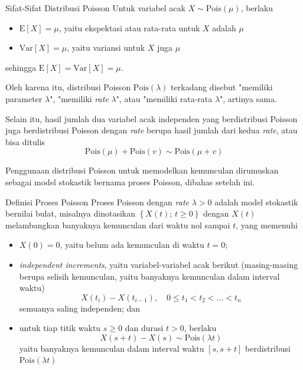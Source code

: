 \documentclass{beamer}
\newcommand{\pars}[1]{\left(#1\right)}
\newcommand{\brackets}[1]{\left[#1\right]}
\newcommand{\braces}[1]{\left\{#1\right\}}
\begin{document}
\begin{frame}{Sifat-Sifat Distribusi Poisson}
    Untuk variabel acak \(X \sim \text{Pois}(\mu)\), berlaku
    \begin{itemize}
        \item \(\text{E}\brackets{X} = \mu\), yaitu ekspektasi atau rata-rata untuk \(X\) adalah \(\mu\)
        \item \(\text{Var}\brackets{X} = \mu\), yaitu variansi untuk \(X\) juga \(\mu\)
    \end{itemize}
    sehingga \(\text{E}\brackets{X} = \text{Var}\brackets{X} = \mu\).

    Oleh karena itu, distribusi Poisson \(\text{Pois}(\lambda)\) terkadang disebut "memiliki parameter \(\lambda\)", "memiliki \textit{rate} \(\lambda\)", atau "memiliki rata-rata \(\lambda\)", artinya sama.

    Selain itu, hasil jumlah dua variabel acak independen yang berdistribusi Poisson juga berdistribusi Poisson dengan \textit{rate} berupa hasil jumlah dari kedua \textit{rate}, atau bisa ditulis
    \[\text{Pois}(\mu) + \text{Pois}(v) \sim \text{Pois}(\mu + v)\]

    Penggunaan distribusi Poisson untuk memodelkan kemunculan dirumuskan sebagai model stokastik bernama proses Poisson, dibahas setelah ini.
\end{frame}

\begin{frame}{Definisi Proses Poisson}
    Proses Poisson dengan \textit{rate} \(\lambda > 0\) adalah model stokastik bernilai bulat, misalnya dinotasikan \( \braces{X(t); \, t \ge 0} \) dengan \(X(t)\) melambangkan banyaknya kemunculan dari waktu nol sampai \(t\), yang memenuhi
    \begin{itemize}
        \item \(X(0) = 0\), yaitu belum ada kemunculan di waktu \(t=0\);
        \item \textit{independent increments}, yaitu variabel-variabel acak berikut (masing-masing berupa selisih kemunculan, yaitu banyaknya kemunculan dalam interval waktu)
        \[ X\pars{t_i} - X\pars{t_{i-1}}, \quad 0 \le t_1 < t_2 < \dots < t_n \]
        semuanya saling independen; dan
        \item untuk tiap titik waktu \(s \ge 0\) dan durasi \(t > 0\), berlaku
        \[X(s+t) - X(s) \sim \text{Pois}(\lambda t)\]
        yaitu banyaknya kemunculan dalam interval waktu \(\brackets{s,s+t}\) berdistribusi \(\text{Pois}(\lambda t)\)
    \end{itemize}
\end{frame}
\end{document}
